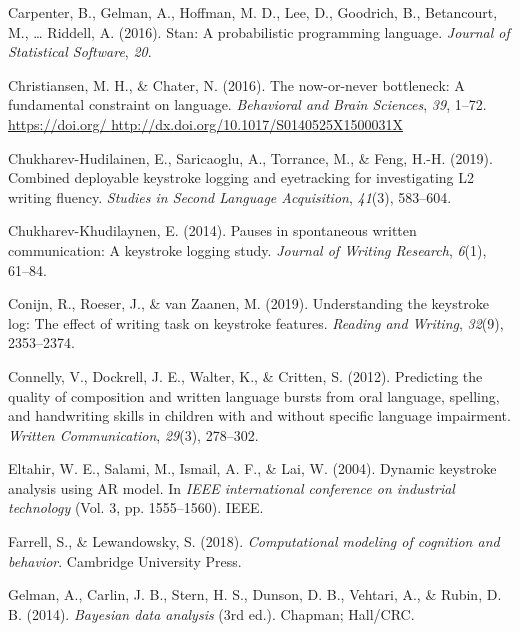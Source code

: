 \documentclass[english,jou,floatsintext]{apa7}
\begin{document}
\leavevmode\hypertarget{ref-carpenter2016stan}{}%
Carpenter, B., Gelman, A., Hoffman, M. D., Lee, D., Goodrich, B., Betancourt, M., \ldots{} Riddell, A. (2016). Stan: A probabilistic programming language. \emph{Journal of Statistical Software}, \emph{20}.

\leavevmode\hypertarget{ref-christiansen2016now}{}%
Christiansen, M. H., \& Chater, N. (2016). The now-or-never bottleneck: A fundamental constraint on language. \emph{Behavioral and Brain Sciences}, \emph{39}, 1--72. \href{https://doi.org/\%20http://dx.doi.org/10.1017/S0140525X1500031X}{https://doi.org/ http://dx.doi.org/10.1017/S0140525X1500031X}

\leavevmode\hypertarget{ref-chukharev2019combined}{}%
Chukharev-Hudilainen, E., Saricaoglu, A., Torrance, M., \& Feng, H.-H. (2019). Combined deployable keystroke logging and eyetracking for investigating L2 writing fluency. \emph{Studies in Second Language Acquisition}, \emph{41}(3), 583--604.

\leavevmode\hypertarget{ref-chukharev2014pauses}{}%
Chukharev-Khudilaynen, E. (2014). Pauses in spontaneous written communication: A keystroke logging study. \emph{Journal of Writing Research}, \emph{6}(1), 61--84.

\leavevmode\hypertarget{ref-conijn2019understanding}{}%
Conijn, R., Roeser, J., \& van Zaanen, M. (2019). Understanding the keystroke log: The effect of writing task on keystroke features. \emph{Reading and Writing}, \emph{32}(9), 2353--2374.

\leavevmode\hypertarget{ref-connelly2012predicting}{}%
Connelly, V., Dockrell, J. E., Walter, K., \& Critten, S. (2012). Predicting the quality of composition and written language bursts from oral language, spelling, and handwriting skills in children with and without specific language impairment. \emph{Written Communication}, \emph{29}(3), 278--302.

\leavevmode\hypertarget{ref-eltahir2004dynamic}{}%
Eltahir, W. E., Salami, M., Ismail, A. F., \& Lai, W. (2004). Dynamic keystroke analysis using AR model. In \emph{IEEE international conference on industrial technology} (Vol. 3, pp. 1555--1560). IEEE.

\leavevmode\hypertarget{ref-farrell2018computational}{}%
Farrell, S., \& Lewandowsky, S. (2018). \emph{Computational modeling of cognition and behavior}. Cambridge University Press.

\leavevmode\hypertarget{ref-gelman2014}{}%
Gelman, A., Carlin, J. B., Stern, H. S., Dunson, D. B., Vehtari, A., \& Rubin, D. B. (2014). \emph{Bayesian data analysis} (3rd ed.). Chapman; Hall/CRC.
\end{document}
